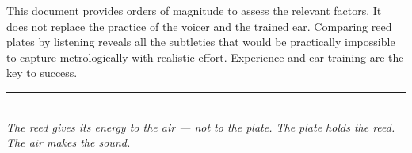 \documentclass[11pt,a4paper]{article}
\begin{document}
This document provides orders of magnitude to assess the relevant factors. It does not replace the practice of the voicer and the trained ear. Comparing reed plates by listening reveals all the subtleties that would be practically impossible to capture metrologically with realistic effort. Experience and ear training are the key to success.

\vspace{3mm}
\begin{center}
\textcolor{accentred}{\rule{0.6\textwidth}{1pt}}\\[4pt]
{\small\itshape The reed gives its energy to the air --- not to the plate. The plate holds the reed. The air makes the sound.}
\end{center}
\end{document}

